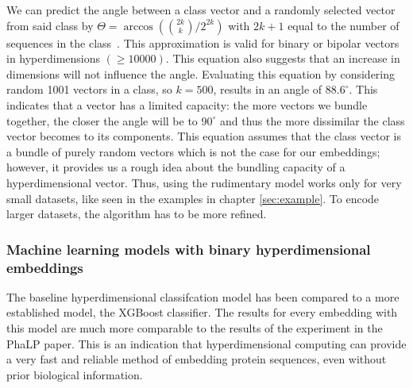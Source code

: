 We can predict the angle between a class vector and a randomly selected vector from said class by $\Theta = \arccos({2k \choose k}/2^{2k})$ with $2k+1$ equal to the number of sequences in the class~\cite{sathdv}. This approximation is valid for binary or bipolar vectors in hyperdimensions $(\ge 10000)$. This equation also suggests that an increase in dimensions will not influence the angle. Evaluating this equation by considering random 1001 vectors in a class, so $k = 500$, results in an angle of $88.6^{\circ}$. This indicates that a vector has a limited capacity: the more vectors we bundle together, the closer the angle will be to $90^{\circ}$ and thus the more dissimilar the class vector becomes to its components. This equation assumes that the class vector is a bundle of purely random vectors which is not the case for our embeddings; however, it provides us a rough idea about the bundling capacity of a hyperdimensional vector. Thus, using the rudimentary model works only for very small datasets, like seen in the examples in chapter \ref{sec:example}. To encode larger datasets, the algorithm has to be more refined.

\subsubsection*{Machine learning models with binary hyperdimensional embeddings}
The baseline hyperdimensional classifcation model has been compared to a more established model, the XGBoost classifier. The results for every embedding with this model are much more comparable to the results of the experiment in the PhaLP paper. This is an indication that hyperdimensional computing can provide a very fast and reliable method of embedding protein sequences, even without prior biological information.